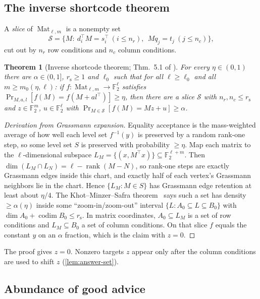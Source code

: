 \documentclass[11pt]{article}
\newtheorem{theorem}{Theorem}[section]
\theoremstyle{definition}
\theoremstyle{remark}
\newcommand{\F}{\mathbb F}
\newcommand{\cS}{\mathcal S}
\newcommand{\rs}{r_{\mathrm s}}
\DeclareMathOperator{\rank}{rank}
\DeclareMathOperator{\Mat}{Mat}
\begin{document}
\subsection{The inverse shortcode theorem}

A \emph{slice} of $\Mat_{\ell,m}$ is a nonempty set
\[
\cS=\{M:\ d_i^\top M=s_i^\top\ (i\le n_r),\ \ Mq_j=t_j\ (j\le n_c)\},
\]
cut out by $n_r$ row conditions and $n_c$ column conditions.

\begin{theorem}[Inverse shortcode theorem; Thm.~5.1 of \cite{OpenAI-UGC}]\label{thm:inverse}
For every $\eta\in(0,1)$ there are $\alpha\in(0,1]$, $\rs\ge1$ and $\ell_0$ such
that for all $\ell\ge\ell_0$ and all $m\ge m_0(\eta,\ell)$: if
$f\colon\Mat_{\ell,m}\to\F_2^\ell$ satisfies
$\Pr_{M,a,l}[f(M)=f(M+al^\top)]\ge\eta$, then there are a slice $\cS$ with
$n_r,n_c\le\rs$ and $z\in\F_2^m$, $u\in\F_2^\ell$ with
$\Pr_{M\in\cS}[f(M)=Mz+u]\ge\alpha$.
\end{theorem}

\begin{proof}[Derivation from Grassmann expansion]
Equality acceptance is the mass-weighted average of how well each level set
$f^{-1}(y)$ is preserved by a random rank-one step, so some level set $S$ is
preserved with probability $\ge\eta$. Map each matrix to the
$\ell$-dimensional subspace $L_M=\{(x,M^\top x)\}\subseteq\F_2^{\ell+m}$. Then
$\dim(L_M\cap L_N)=\ell-\rank(M-N)$, so rank-one steps are exactly Grassmann
edges inside this chart, and exactly half of each vertex's Grassmann neighbors
lie in the chart. Hence $\{L_M:M\in S\}$ has Grassmann edge retention at least
about $\eta/4$. The Khot--Minzer--Safra theorem~\cite{KMS23} says such a set has
density $\ge\alpha(\eta)$ inside some ``zoom-in/zoom-out'' interval
$\{L:A_0\subseteq L\subseteq B_0\}$ with $\dim A_0+\operatorname{codim}B_0\le\rs$.
In matrix coordinates, $A_0\subseteq L_M$ is a set of row conditions and
$L_M\subseteq B_0$ a set of column conditions. On that slice $f$ equals the
constant $y$ on an $\alpha$ fraction, which is the claim with $z=0$.
\end{proof}

The proof gives $z=0$. Nonzero targets $z$ appear only after the column
conditions are used to shift $z$ (\cref{lem:answer-set}).

\subsection{Abundance of good advice}\label{sec:abundance}
\end{document}
